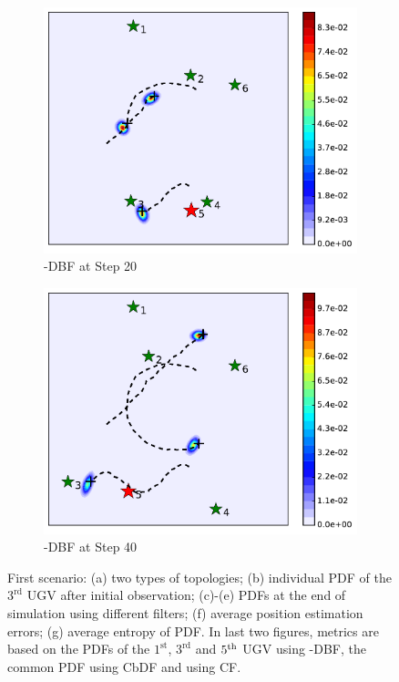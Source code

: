 \begin{figure}
\begin{subfigure}[b]{0.23\textwidth}
			\includegraphics[width=\textwidth]{figures/dbf_hetero_mov_sen_mov_tar_rbt5_step20}
			\caption{\proto-DBF at Step 20}\label{fig:step20}
		\end{subfigure}	
		\begin{subfigure}[b]{0.23\textwidth}
			\includegraphics[width=\textwidth]{figures/dbf_hetero_mov_sen_mov_tar_rbt5_step40}
			\caption{\proto-DBF at Step 40}\label{fig:step40}
		\end{subfigure}			
		\caption{
			First scenario: (a) two types of topologies; (b) individual PDF of the $3^\text{rd}$ UGV after initial observation; (c)-(e) PDFs at the end of simulation using different filters; (f) average position estimation errors; (g) average entropy of PDF. In last two figures, metrics are based on the PDFs of the $1^\text{st}$, $3^\text{rd}$ and $5^\text{th}$ UGV using \proto-DBF, the common PDF using CbDF and using CF.}
		\label{fig:mov_sen_mov_tar1}
	\end{figure}
			

